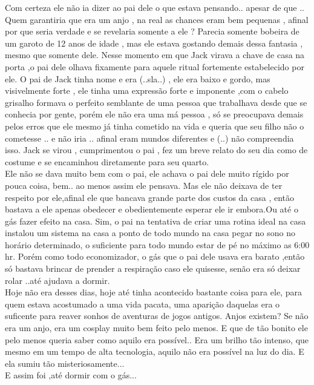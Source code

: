 \documentclass{book}
\begin{document}
Com certeza ele não ia dizer ao pai dele o que estava pensando.. apesar de que .. Quem garantiria que era um anjo , na real as chances eram bem pequenas , afinal por que seria verdade e se revelaria somente a ele ? Parecia somente bobeira de um garoto de 12 anos de idade , mas ele estava gostando demais dessa fantasia , mesmo que somente dele. Nesse momento em que Jack virava a chave de casa na porta ,o pai dele olhava fixamente para aquele ritual fortemente estabelecido por ele. O pai de Jack tinha nome e era (..sla..) , ele era baixo e gordo, mas visivelmente forte , ele tinha uma expressão forte e imponente ,com o cabelo grisalho formava o perfeito semblante de uma pessoa que trabalhava desde que se conhecia por gente, porém ele não era uma má pessoa , só se preocupava demais pelos erros que ele mesmo já tinha cometido na vida e queria que seu filho não o cometesse .. e não iria .. afinal eram mundos diferentes e (..) não compreendia isso. Jack se virou , cumprimentou o pai , fez um breve relato do seu dia como de costume e se encaminhou diretamente para seu quarto.\\ 
 
  Ele não se dava muito bem com o pai, ele achava o pai dele muito rígido por pouca coisa, bem.. ao menos assim ele pensava. Mas ele não deixava de ter respeito por ele,afinal ele que bancava grande parte dos custos da casa , então bastava a ele apenas obedecer e obedientemente esperar ele ir embora.Ou até o gás fazer efeito na casa. Sim, o pai na tentativa de criar uma rotina ideal na casa instalou um sistema na casa a ponto de todo mundo na casa pegar no sono no horário determinado, o suficiente para todo mundo estar de pé no máximo as 6:00 hr. Porém como todo economizador, o gás que o pai dele usava era barato ,então só bastava brincar de prender a respiração caso ele quisesse, senão era só deixar rolar ..até ajudava a dormir. \\
 Hoje não era desses dias, hoje até tinha acontecido bastante coisa para ele, para quem estava acostumado a uma vida pacata, uma aparição daquelas era o suficente para reaver sonhos de aventuras de jogos antigos. Anjos existem? Se não era um anjo, era um cosplay muito bem feito pelo menos. E que de tão bonito ele pelo menos queria saber como aquilo era possível.. Era um brilho tão intenso, que mesmo em um tempo de alta tecnologia, aquilo não era possível na luz do dia. E ela sumiu tão misteriosamente... \\
 
 E assim foi ,até dormir com o gás...
 
\end{document}
